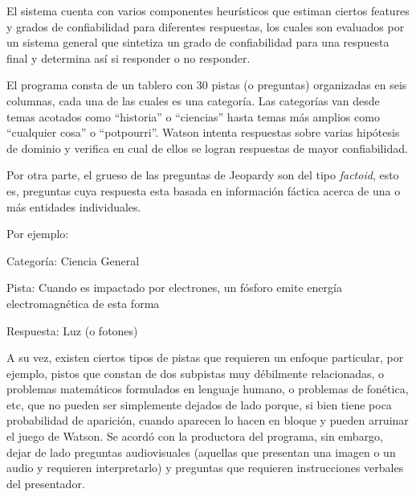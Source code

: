 \bigskip

El sistema cuenta con varios componentes heurísticos que estiman
ciertos features y grados de confiabilidad para diferentes respuestas,
los cuales son evaluados por un sistema general que sintetiza un grado
de confiabilidad para una respuesta final y determina así si
responder o no responder. 

El programa consta de un tablero con 30 pistas (o preguntas) organizadas
en seis columnas, cada una de las cuales es una categoría. Las
categorías van desde temas acotados como
{\textquotedblleft}historia{\textquotedblright} o
{\textquotedblleft}ciencias{\textquotedblright} hasta temas más
amplios como {\textquotedblleft}cualquier cosa{\textquotedblright} o
{\textquotedblleft}potpourri{\textquotedblright}. Watson intenta
respuestas sobre varias hipótesis de dominio y verifica en cual de
ellos se logran respuestas de mayor confiabilidad. 

Por otra parte, el grueso de las preguntas de Jeopardy son del tipo
\textit{factoid}, esto es, preguntas cuya respuesta esta basada en
información fáctica acerca de una o más entidades individuales.


\bigskip

Por ejemplo:

Categoría: Ciencia General

Pista: Cuando es impactado por electrones, un fósforo emite energía
electromagnética de esta forma

Respuesta: Luz (o fotones)


\bigskip

A su vez, existen ciertos tipos de pistas que requieren un enfoque
particular, por ejemplo, pistos que constan de dos subpistas muy
débilmente relacionadas, o problemas matemáticos formulados en
lenguaje humano, o problemas de fonética, etc, que no pueden ser
simplemente dejados de lado porque, si bien tiene poca probabilidad de
aparición, cuando aparecen lo hacen en bloque y pueden arruinar el
juego de Watson. Se acordó con la productora del programa, sin
embargo, dejar de lado preguntas audiovisuales (aquellas que presentan
una imagen o un audio y requieren interpretarlo) y preguntas que
requieren instrucciones verbales del presentador.


\bigskip

